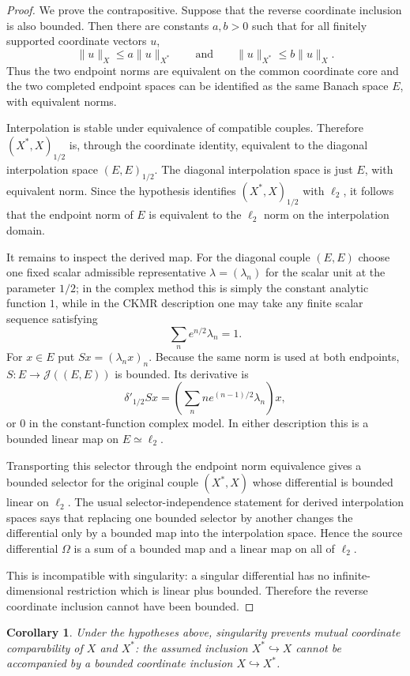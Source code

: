 \documentclass[11pt]{amsart}
\newtheorem{corollary}{Corollary}
\theoremstyle{remark}
\newcommand{\elltwo}{\ell_2}
\newcommand{\J}{\mathcal J}
\newcommand{\Om}{\Omega}
\begin{document}
\begin{proof}
We prove the contrapositive.  Suppose that the reverse coordinate inclusion is
also bounded.  Then there are constants $a,b>0$ such that for all finitely
supported coordinate vectors $u$,
\[
  \|u\|_X \le a\|u\|_{X^*}
  \qquad\text{and}\qquad
  \|u\|_{X^*}\le b\|u\|_X .
\]
Thus the two endpoint norms are equivalent on the common coordinate core and the
two completed endpoint spaces can be identified as the same Banach space $E$,
with equivalent norms.

Interpolation is stable under equivalence of compatible couples.  Therefore
$(X^*,X)_{1/2}$ is, through the coordinate identity, equivalent to the diagonal
interpolation space $(E,E)_{1/2}$.  The diagonal interpolation space is just
$E$, with equivalent norm.  Since the hypothesis identifies
$(X^*,X)_{1/2}$ with $\elltwo$, it follows that the endpoint norm of $E$ is
equivalent to the $\elltwo$ norm on the interpolation domain.

It remains to inspect the derived map.  For the diagonal couple $(E,E)$ choose
one fixed scalar admissible representative $\lambda=(\lambda_n)$ for the scalar
unit at the parameter $1/2$; in the complex method this is simply the constant
analytic function $1$, while in the CKMR description one may take any finite
scalar sequence satisfying
\[
  \sum_n e^{n/2}\lambda_n=1 .
\]
For $x\in E$ put $Sx=(\lambda_n x)_n$.  Because the same norm is used at both
endpoints, $S:E\to \J((E,E))$ is bounded.  Its derivative is
\[
  \delta'_{1/2}Sx
   = \left(\sum_n n e^{(n-1)/2}\lambda_n\right)x,
\]
or $0$ in the constant-function complex model.  In either description this is a
bounded linear map on $E\simeq\elltwo$.

Transporting this selector through the endpoint norm equivalence gives a bounded
selector for the original couple $(X^*,X)$ whose differential is bounded linear
on $\elltwo$.  The usual selector-independence statement for derived
interpolation spaces says that replacing one bounded selector by another changes
the differential only by a bounded map into the interpolation space.  Hence the
source differential $\Om$ is a sum of a bounded map and a linear map on all of
$\elltwo$.

This is incompatible with singularity: a singular differential has no
infinite-dimensional restriction which is linear plus bounded.  Therefore the
reverse coordinate inclusion cannot have been bounded.
\end{proof}

\begin{corollary}
Under the hypotheses above, singularity prevents mutual coordinate comparability
of $X$ and $X^*$: the assumed inclusion $X^*\hookrightarrow X$ cannot be
accompanied by a bounded coordinate inclusion $X\hookrightarrow X^*$.
\end{corollary}
\end{document}
